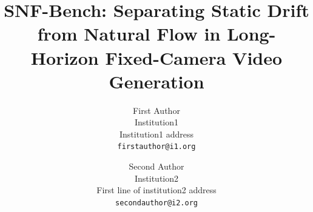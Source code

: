 \documentclass[10pt,twocolumn,letterpaper]{article}
\title{SNF-Bench: Separating Static Drift from Natural Flow in Long-Horizon Fixed-Camera Video Generation}
\author{First Author\\
Institution1\\
Institution1 address\\
{\tt\small firstauthor@i1.org}
\and
Second Author\\
Institution2\\
First line of institution2 address\\
{\tt\small secondauthor@i2.org}
}
\begin{document}
\maketitle
    








{
    \small
    
    
}
\end{document}

